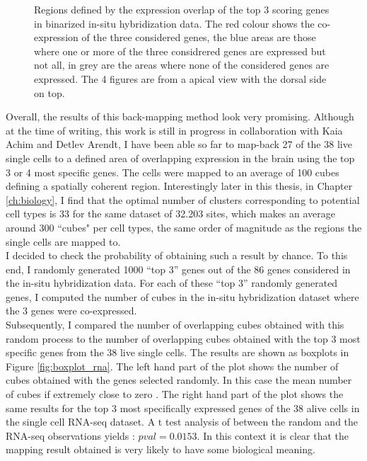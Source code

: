 \begin{figure}[H]
        \caption{Regions defined by the expression overlap of the top 3 scoring genes in \cite{Tomer10} binarized in-situ hybridization data. The red colour shows the co-expression of the three considered genes, the blue areas are those where one or more of the three considrered genes are expressed but not all, in grey are the areas where none of the considered genes are expressed. The 4 figures are from a apical view with the dorsal side on top.}\label{fig:cell_localization}
\end{figure}

Overall, the results of this back-mapping method look very promising. Although at the time of writing, this work is still in progress in collaboration with Kaia Achim and Detlev Arendt, I have been able so far to map-back 27 of the 38 live single cells to a defined area of overlapping expression in the brain using the top 3 or 4 most specific genes. The cells were mapped to an average of 100 cubes defining a spatially coherent region. Interestingly later in this thesis, in Chapter \ref{ch:biology}, I find that the optimal number of clusters corresponding to potential cell types is 33 for the same dataset of 32.203 sites, which makes an average around 300 ``cubes" per cell types, the same order of magnitude as the regions the single cells are mapped to.  \\

I decided to check the probability of obtaining such a result by chance. To this end, I randomly generated 1000 ``top 3'' genes out of the 86 genes considered in the in-situ hybridization data. For each of these ``top 3'' randomly generated genes, I computed the number of cubes in the in-situ hybridization dataset where the 3 genes were co-expressed.\\

Subsequently, I compared the number of overlapping cubes obtained with this random process to the number of overlapping cubes obtained with the top 3 most specific genes from the 38 live single cells. The results are shown as boxplots in Figure \ref{fig:boxplot_rna}. The left hand part of the plot shows the number of cubes obtained with the genes selected randomly. In this case the mean number of cubes if extremely close to zero . The right hand part of the plot shows the same results for the top 3 most specifically expressed genes of the 38 alive cells in the single cell RNA-seq dataset. A t test analysis of between the random and the RNA-seq observations yields : $pval = 0.0153$. In this context it is clear that the mapping result obtained is very likely to have some biological meaning.

